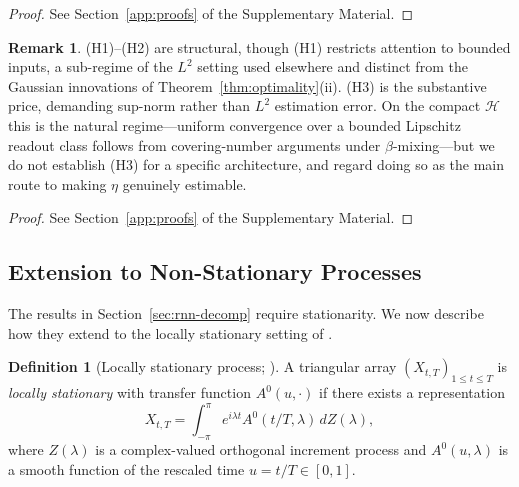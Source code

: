 \documentclass[bj,authoryear]{imsart}
\theoremstyle{plain}
\theoremstyle{definition}
\newtheorem{definition}{Definition}[section]
\newtheorem{remark}{Remark}[section]
\begin{document}
\begin{proof}
  See Section~\ref{app:proofs} of the Supplementary Material.
\end{proof}

\begin{remark}%
  (H1)--(H2) are structural, though (H1) restricts attention to bounded inputs,
  a sub-regime of the $L^2$ setting used elsewhere and distinct from the Gaussian
  innovations of Theorem~\ref{thm:optimality}(ii).  (H3) is the substantive
  price, demanding sup-norm rather than $L^2$ estimation error.  On the compact $\mathcal H$ this is the
  natural regime---uniform convergence over a bounded Lipschitz readout class
  follows from covering-number arguments under $\beta$-mixing---but we do not
  establish (H3) for a specific architecture, and regard doing so as the main
  route to making $\eta$ genuinely estimable.
\end{remark}

\begin{proof}
  See Section~\ref{app:proofs} of the Supplementary Material.
\end{proof}


\subsection{Extension to Non-Stationary Processes}
\label{sec:nonstationary}

The results in Section~\ref{sec:rnn-decomp} require
stationarity.  We now describe how they extend to the locally stationary
setting of \citet{dahlhaus1997fitting}.

\begin{definition}[Locally stationary process; \citealt{dahlhaus1997fitting}]
\label{def:ls}
  A triangular array $(X_{t,T})_{1\leq t\leq T}$ is \emph{locally stationary}
  with transfer function $A^0(u,\cdot)$ if there exists a representation
  \[
    X_{t,T} = \int_{-\pi}^{\pi} e^{i\lambda t} A^0(t/T, \lambda)\,dZ(\lambda),
  \]
  where $Z(\lambda)$ is a complex-valued orthogonal increment process and
  $A^0(u,\lambda)$ is a smooth function of the rescaled time $u = t/T \in [0,1]$.
\end{definition}
\end{document}
